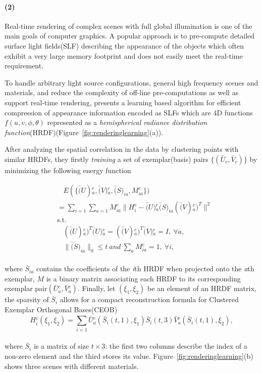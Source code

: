 \paragraph{(2)}
Real-time rendering of complex scenes with full global illumination is one of the main goals of computer graphics.
A popular approach is to pre-compute detailed surface light fields(SLF) describing the appearance of the objects which often exhibit a very large memory footprint and does not easily meet the real-time requirement.

To handle arbitrary light source configurations, general high frequency scenes and materials,
and reduce the complexity of off-line pre-computations as well as support real-time rendering,
\cite{miandji2013learning} presents a learning based algorithm for efficient compression of appearance information encoded as SLFs
which are 4D functions$f(u,v,\phi,\theta)$ represented as a \textit{hemispherical radiance distribution function}(HRDF)(Figure~\ref{fig:renderinglearning}(a)).

After analyzing the spatial correlation in the data by clustering points with similar HRDFs,
they firstly \textit{training} a set of exemplar(basis) pairs $\{(\bar{U}_{c},\bar{V}_c)\}$ by minimizing the following energy function

\small{
\begin{equation}
 \label{eq:L1reconstruction}
 \begin{aligned}
 & ~~~~E(\{\bar(U){_{a}^{c}}, \bar(V){_{a}^{c}}, \bar(S)_{ia}, M{_{ia}^{c}}\}) \\
 & =\sum_{i=1}^{} \sum_{a=1}^{}
   M{_{ia}^{c}}
   \| H{_{i}^{c}} - \bar(U){_{a}^{c}} \bar(S)_{ia} (\bar(V){_{a}^{c}})^{T}\|^2 \\
 &\mathrm{s.t.} \\
 &~~~~  (\bar(U){_{a}^{c}})^{T} \bar(U){_{a}^{c}} = (\bar(V){_{a}^{c}})^{T} \bar(V){_{a}^{c}} = I,~\forall a,\\
 &~~~~  \| \bar(S)_{ia} \|_0 \le t ~and~ \sum_{a}^{} M{_{ia}^{c}}=1,~\forall i,
 \end{aligned}
\end{equation}
}
\\
where $\bar{S}_{ia}$ contains the coefficients of the \textit{i}th HRDF when projected onto the \textit{a}th exemplar, $M$ is a binary matrix associating each HRDF to its corresponding exemplar pair$(\bar{U}{_{a}^{c}},\bar{V}{_{a}^{c}})$. Finally, let $(\xi_1, \xi_2)$ be an element of an HRDF matrix, the sparsity of $\bar{S}_i$ allows for a compact reconstruction formula for Clustered Exemplar Orthogonal Bases(CEOB)
\small{
\begin{equation}
 \label{eq:L1reconstruction}
 H{_{i}^{c}}(\xi_1, \xi_2) = \sum_{i=1}^{} \bar{U}{_{a}^{c}}(\bar{S}_{i}(t,1), \xi_1) \bar{S}_{i}(t,3) \bar V{_{a}^{c}}(\bar{S}_{i}(t,1), \xi_2),
\end{equation}
}
\\
where $\bar{S}_{i}$ is a matrix of size $t\times3$: the first two columns describe the index of a non-zero element and the third stores its value.
Figure~\ref{fig:renderinglearning}(b) shows three scenes with different materials.

